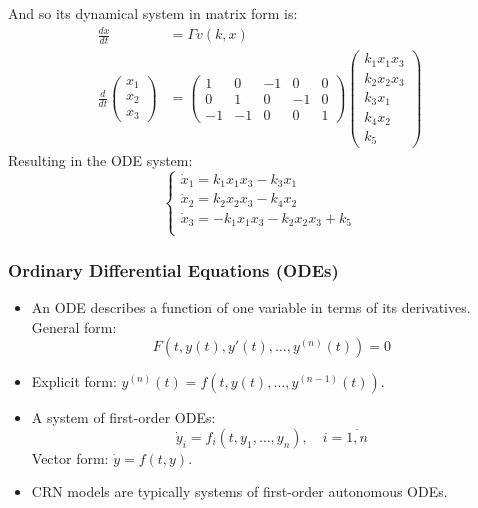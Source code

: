 \documentclass[aspectratio=169]{beamer}
\begin{document}
\begin{frame}
	And so its dynamical system in matrix form is:
	\begin{align*}
		\frac{dx}{dt} &= \Gamma v(k,x) \\
		\frac{d}{dt}
		\begin{pmatrix*}
			x_1	\\
			x_2	\\
			x_3	
		\end{pmatrix*} &=
		\begin{pmatrix*}
			1 & 0 & -1 & 0 & 0 \\
			0 & 1 & 0 & -1 & 0 \\
			-1 & -1 & 0 & 0 & 1
		\end{pmatrix*}
		\begin{pmatrix}
			k_1 x_1 x_3 \\
			k_2 x_2 x_3 \\
			k_3 x_1 \\
			k_4 x_2 \\
			k_5
		\end{pmatrix}
	\end{align*}
	Resulting in the ODE system:
	\[
		\begin{cases*}
			\dot{x}_1 = k_1 x_1 x_3 - k_3x_1  \\
			\dot{x}_2 = k_2 x_2 x_3 - k_4 x_2  \\
			\dot{x}_3 = -k_1 x_1 x_3 - k_2 x_2 x_3 + k_5 \\
		\end{cases*}
	\]
\end{frame}

\begin{frame}{\insertsectionhead}
	\frametitle{Ordinary Differential Equations (ODEs)}
	\begin{itemize}
		\item An ODE describes a function of one variable in terms of its derivatives. General form:
			$$ F(t, y(t), y'(t), \dots, y^{(n)}(t)) = 0 $$
		\item \alert{Explicit form}: $y^{(n)}(t) = f(t, y(t), \dots, y^{(n-1)}(t))$.
		\item A \alert{system of first-order ODEs}:
			$$ \dot{y}_i = f_i(t, y_1, \dots, y_n), \quad i=\overline{1, n} $$
			Vector form: $\dot{y} = f(t,y)$.
		\item CRN models are typically systems of first-order \alert{autonomous} ODEs.
	\end{itemize}	
\end{frame}
\end{document}

